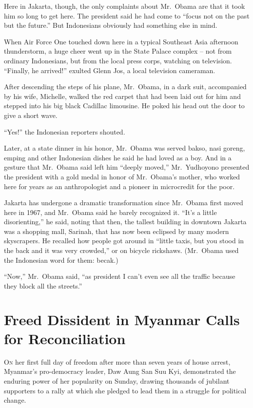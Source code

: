 ﻿\documentclass[12pt]{article}
\begin{document}
Here in Jakarta, though, the only complaints about Mr.~Obama are that it took him so long to get
here. The president said he had come to ``focus not on the past but the future.'' But Indonesians
obviously had something else in mind.

When Air Force One touched down here in a typical Southeast Asia afternoon thunderstorm, a huge
cheer went up in the State Palace complex -- not from ordinary Indonesians, but from the local press
corps, watching on television. ``Finally, he arrived!'' exulted Glenn Jos, a local television
cameraman.

After descending the steps of his plane, Mr.~Obama, in a dark suit, accompanied by his wife,
Michelle, walked the red carpet that had been laid out for him and stepped into his big black
Cadillac limousine. He poked his head out the door to give a short wave.

``Yes!'' the Indonesian reporters shouted.

Later, at a state dinner in his honor, Mr.~Obama was served bakso, nasi goreng, emping and other
Indonesian dishes he said he had loved as a boy. And in a gesture that Mr.~Obama said left him
``deeply moved,'' Mr.~Yudhoyono presented the president with a gold medal in honor of Mr.~Obama's
mother, who worked here for years as an anthropologist and a pioneer in microcredit for the poor.

Jakarta has undergone a dramatic transformation since Mr.~Obama first moved here in 1967, and
Mr.~Obama said he barely recognized it. ``It's a little disorienting,'' he said, noting that then,
the tallest building in downtown Jakarta was a shopping mall, Sarinah, that has now been eclipsed by
many modern skyscrapers. He recalled how people got around in ``little taxis, but you stood in the
back and it was very crowded,'' or on bicycle rickshaws. (Mr.~Obama used the Indonesian word for
them: becak.)

``Now,'' Mr.~Obama said, ``as president I can't even see all the traffic because they block all the
streets.''

\section{Freed Dissident in Myanmar Calls for Reconciliation}

\lettrine{O}{n} her first full day of freedom after more than seven years of
house arrest, Myanmar's pro-democracy leader, Daw Aung San Suu Kyi, demonstrated the enduring power
of her popularity on Sunday, drawing thousands of jubilant supporters to a rally at which she
pledged to lead them in a struggle for political change.
\end{document}
